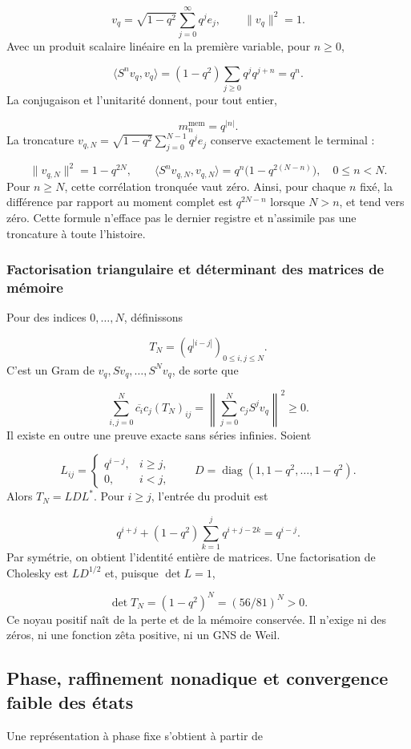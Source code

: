 \[
v_q=\sqrt{1-q^2}\sum_{j=0}^{\infty}q^j e_j,
\qquad \|v_q\|^2=1.
\]
Avec un produit scalaire linéaire en la première variable, pour \(n\ge0\),

\[
\langle S^n v_q,v_q\rangle
=(1-q^2)\sum_{j\ge0}q^j q^{j+n}=q^n.
\]
La conjugaison et l'unitarité donnent, pour tout entier,

\[
\boxed{m_n^{\mathrm{mem}}=q^{|n|}.}
\]
La troncature \(v_{q,N}=\sqrt{1-q^2}\sum_{j=0}^{N-1}q^j e_j\) conserve exactement le terminal :

\[
\|v_{q,N}\|^2=1-q^{2N},\qquad
\langle S^n v_{q,N},v_{q,N}\rangle
=q^n\bigl(1-q^{2(N-n)}\bigr),\quad 0\le n<N.
\]
Pour \(n\ge N\), cette corrélation tronquée vaut zéro. Ainsi, pour chaque \(n\) fixé, la différence par rapport au moment complet est \(q^{2N-n}\) lorsque \(N>n\), et tend vers zéro. Cette formule n'efface pas le dernier registre et n'assimile pas une troncature à toute l'histoire.


\subsubsection{Factorisation triangulaire et déterminant des matrices de mémoire}
\label{viii:tm-add-m2-2}
Pour des indices \(0,\ldots,N\), définissons

\[
T_N=(q^{|i-j|})_{0\le i,j\le N}.
\]
C'est un Gram de \(v_q,Sv_q,\ldots,S^Nv_q\), de sorte que

\[
\sum_{i,j=0}^{N}\overline{c_i}c_j(T_N)_{ij}
=\left\|\sum_{j=0}^{N}c_jS^jv_q\right\|^2\ge0.
\]
Il existe en outre une preuve exacte sans séries infinies. Soient

\[
L_{ij}=\begin{cases}q^{i-j},&i\ge j,\\0,&i<j,\end{cases}
\qquad D=\operatorname{diag}(1,1-q^2,\ldots,1-q^2).
\]
Alors \(T_N=LDL^*\). Pour \(i\ge j\), l'entrée du produit est

\[
q^{i+j}+(1-q^2)\sum_{k=1}^{j}q^{i+j-2k}
=q^{i-j}.
\]
Par symétrie, on obtient l'identité entière de matrices. Une factorisation de Cholesky est \(L D^{1/2}\) et, puisque \(\det L=1\),

\[
\boxed{\det T_N=(1-q^2)^N=(56/81)^N>0.}
\]
Ce noyau positif naît de la perte et de la mémoire conservée. Il n'exige ni des zéros, ni une fonction zêta positive, ni un GNS de Weil.


\subsection{Phase, raffinement nonadique et convergence faible des états}
\label{viii:tm-add-m3}
Une représentation à phase fixe s'obtient à partir de

